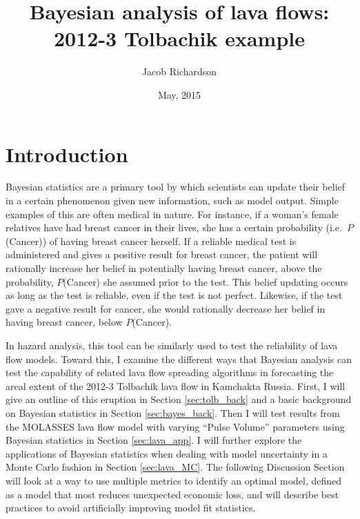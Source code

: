 \documentclass[12pt,letter]{article}
\title{Bayesian analysis of lava flows:\\2012-3 Tolbachik example}
\date{May, 2015}
\author{Jacob Richardson}
\begin{document}
\maketitle

\section{Introduction}
Bayesian statistics are a primary tool by which scientists can update their belief in a certain phenomenon given new information, such as model output. Simple examples of this are often medical in nature. For instance, if a woman's female relatives have had breast cancer in their lives, she has a certain probability (i.e.~$P$(Cancer)) of having breast cancer herself. If a reliable medical test is administered and gives a positive result for breast cancer, the patient will rationally increase her belief in potentially having breast cancer, above the probability, $P$(Cancer) she assumed prior to the test. This belief updating occurs as long as the test is reliable, even if the test is not perfect. Likewise, if the test gave a negative result for cancer, she would rationally decrease her belief in having breast cancer, below $P$(Cancer).

In hazard analysis, this tool can be similarly used to test the reliability of lava flow models. Toward this, I examine the different ways that Bayesian analysis can test the capability of related lava flow spreading algorithms in forecasting the areal extent of the 2012-3 Tolbachik lava flow in Kamchakta Russia. First, I will give an outline of this eruption in Section \ref{sec:tolb_back} and a basic background on Bayesian statistics in Section \ref{sec:bayes_back}. Then I will test results from the MOLASSES lava flow model with varying ``Pulse Volume'' parameters using Bayesian statistics in Section \ref{sec:lava_app}. I will further explore the applications of Bayesian statistics when dealing with model uncertainty in a Monte Carlo fashion in Section \ref{sec:lava_MC}. The following Discussion Section will look at a way to use multiple metrics to identify an optimal model, defined as a model that most reduces unexpected economic loss, and will describe best practices to avoid artificially improving model fit statistics.
\end{document}
